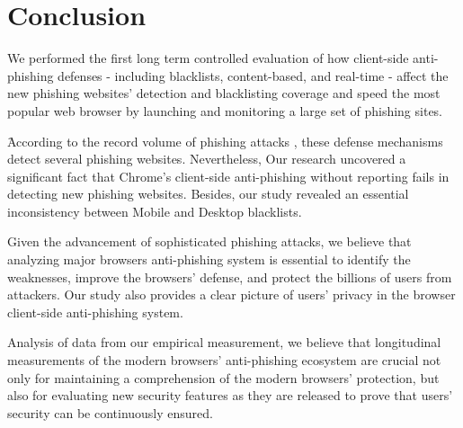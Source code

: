 \section{Conclusion}
\label{s:conclusion}

We performed the first long term controlled evaluation of how client-side anti-phishing defenses - including blacklists, content-based, and real-time - affect the new phishing websites' detection and blacklisting coverage and speed the most popular web browser by launching and monitoring a large set of phishing sites. 

َAccording to the record volume of phishing attacks \cite{APWG}, these defense mechanisms detect several phishing websites. Nevertheless, Our research uncovered a significant fact that Chrome's client-side anti-phishing without reporting fails in detecting new phishing websites. Besides, our study revealed an essential inconsistency between Mobile and Desktop blacklists. 

Given the advancement of sophisticated phishing attacks, we believe that analyzing major browsers anti-phishing system is essential to identify the weaknesses, improve the browsers' defense, and protect the billions of users from attackers. Our study also provides a clear picture of users' privacy in the browser client-side anti-phishing system.

Analysis of data from our empirical measurement, we believe that longitudinal measurements of the modern browsers' anti-phishing ecosystem are crucial not only for maintaining a comprehension
of the modern browsers' protection, but also for
evaluating new security features as they are released to prove that users' security can be continuously ensured.